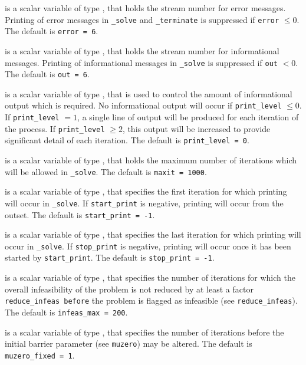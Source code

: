 \begin{description}

 is a scalar variable of type \integer, that holds the
stream number for error messages. Printing of error messages in
{\tt \packagename\_solve} and {\tt \packagename\_terminate} is suppressed if
{\tt error} $\leq 0$.
The default is {\tt error = 6}.

 is a scalar variable of type \integer, that holds the
stream number for informational messages. Printing of informational messages in
{\tt \packagename\_solve} is suppressed if {\tt out} $< 0$.
The default is {\tt out = 6}.

 is a scalar variable of type \integer, that is used
to control the amount of informational output which is required. No
informational output will occur if {\tt print\_level} $\leq 0$. If
{\tt print\_level} $= 1$, a single line of output will be produced for each
iteration of the process. If {\tt print\_level} $\geq 2$, this output will be
increased to provide significant detail of each iteration.
The default is {\tt print\_level = 0}.

 is a scalar variable of type \integer, that holds the
maximum number of iterations which will be allowed in {\tt \packagename\_solve}.
The default is {\tt maxit = 1000}.

 is a scalar variable of type \integer, that specifies
the first iteration for which printing will occur in {\tt \packagename\_solve}.
If {\tt start\_print} is negative, printing will occur from the outset.
The default is {\tt start\_print = -1}.

 is a scalar variable of type \integer, that specifies
the last iteration for which printing will occur in  {\tt \packagename\_solve}.
If {\tt stop\_print} is negative, printing will occur once it has been
started by {\tt start\_print}.
The default is {\tt stop\_print = -1}.

 is a scalar variable of type \integer, that specifies
the number of iterations for which the overall infeasibility
of the problem is not reduced by at least a factor {\tt reduce\_infeas
before} the problem is flagged as infeasible (see {\tt reduce\_infeas}).
The default is {\tt infeas\_max = 200}.

 is a scalar variable of type \integer,
that specifies
the number of iterations before the initial barrier parameter
(see {\tt muzero}) may be altered.
The default is {\tt muzero\_fixed = 1}.


\end{description}
